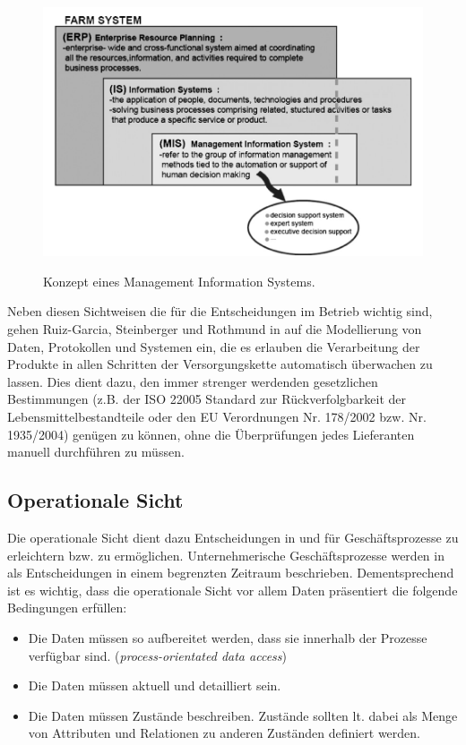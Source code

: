 \begin{figure}[h]
 \includegraphics[scale=0.5,natwidth=\textwidth]{figures/datamodelling/sorensen_fmis_2010.png}
 \centering
 \label{fig:fmishierarchy}
 \caption{Konzept eines Management Information Systems.\cite{jour:Sorensen2010}}
\end{figure}

Neben diesen Sichtweisen die für die Entscheidungen im Betrieb wichtig sind, gehen Ruiz-Garcia, Steinberger und Rothmund in \cite{jour:Ruiz-Garcia2010} auf die Modellierung von Daten, Protokollen und Systemen ein, die es erlauben die Verarbeitung der Produkte in allen Schritten der Versorgungskette automatisch überwachen zu lassen. Dies dient dazu, den immer strenger werdenden gesetzlichen Bestimmungen (z.B. der ISO 22005 Standard zur Rückverfolgbarkeit der Lebensmittelbestandteile oder den EU Verordnungen Nr. 178/2002 bzw. Nr. 1935/2004) genügen zu können, ohne die Überprüfungen jedes Lieferanten manuell durchführen zu müssen.

\subsection{Operationale Sicht}
Die operationale Sicht dient dazu Entscheidungen in und für Geschäftsprozesse zu erleichtern bzw. zu ermöglichen. Unternehmerische Geschäftsprozesse werden in \cite{jour:Schulze2007} als Entscheidungen in einem begrenzten Zeitraum beschrieben. Dementsprechend ist es wichtig, dass die operationale Sicht vor allem Daten präsentiert die folgende Bedingungen erfüllen:

\begin{itemize}
	\item Die Daten müssen so aufbereitet werden, dass sie innerhalb der Prozesse verfügbar sind. (\textit{process-orientated data access})
	\item Die Daten müssen aktuell und detailliert sein.
	\item Die Daten müssen Zustände beschreiben. Zustände sollten lt. \cite{jour:Schulze2007} dabei als Menge von Attributen und Relationen zu anderen Zuständen definiert werden.
\end{itemize}


